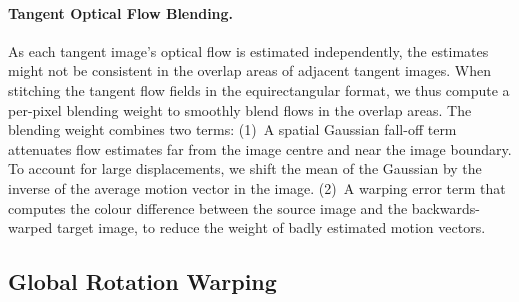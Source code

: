 \paragraph{Tangent Optical Flow Blending.}
%
As each tangent image's optical flow is estimated independently, the estimates might not be consistent in the overlap areas of adjacent tangent images.
%
When stitching the tangent flow fields in the equirectangular format, we thus compute a per-pixel blending weight to smoothly blend flows in the overlap areas.
%
The blending weight combines two terms:
%
(1)~A spatial Gaussian fall-off term attenuates flow estimates far from the image centre and near the image boundary.
To account for large displacements, we shift the mean of the Gaussian by the inverse of the average motion vector in the image.
%
(2)~A warping error term that computes the colour difference between the source image and the backwards-warped target image, to reduce the weight of badly estimated motion vectors.





\subsection{Global Rotation Warping}
\label{sec:approach:warping}

